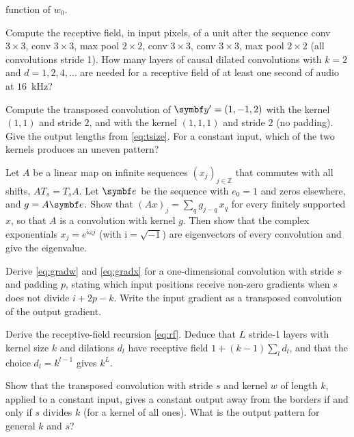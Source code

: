 \documentclass[11pt]{article}
\newcommand{\y}{\vect{y}}
\begin{document}
\begin{questions}
\begin{calculations}
  function of $w_0$.
\item Compute the receptive field, in input pixels, of a unit after the sequence conv $3 \times 3$, conv $3 \times 3$, max pool
  $2 \times 2$, conv $3 \times 3$, conv $3 \times 3$, max pool $2 \times 2$ (all convolutions stride 1). How many layers of
  causal dilated convolutions with $k = 2$ and $d = 1, 2, 4, \dots$ are needed for a receptive field of at least one second
  of audio at $16$~kHz?
\item Compute the transposed convolution of $\y' = (1, -1, 2)$ with the kernel $(1, 1)$ and stride $2$, and with the kernel
  $(1, 1, 1)$ and stride $2$ (no padding). Give the output lengths from \eqref{eq:tsize}. For a constant input, which of the
  two kernels produces an uneven pattern?
\end{calculations}

\begin{derivations}
\item Let $A$ be a linear map on infinite sequences $(x_j)_{j \in \mathbb{Z}}$ that commutes with all shifts,
  $A T_s = T_s A$. Let $\vect{e}$ be the sequence with $e_0 = 1$ and zeros elsewhere, and $g = A\vect{e}$. Show that
  $(A x)_j = \sum_q g_{j-q}\, x_q$ for every finitely supported $x$, so that $A$ is a convolution with kernel $g$. Then show
  that the complex exponentials $x_j = e^{\mathrm{i}\omega j}$ (with $\mathrm{i} = \sqrt{-1}$) are eigenvectors of every
  convolution and give the eigenvalue.
\item Derive \eqref{eq:gradw} and \eqref{eq:gradx} for a one-dimensional convolution with stride $s$ and padding $p$,
  stating which input positions receive non-zero gradients when $s$ does not divide $i + 2p - k$. Write the input gradient
  as a transposed convolution of the output gradient.
\item Derive the receptive-field recursion \eqref{eq:rf}. Deduce that $L$ stride-1 layers with kernel size $k$ and
  dilations $d_l$ have receptive field $1 + (k - 1)\sum_l d_l$, and that the choice $d_l = k^{l-1}$ gives $k^L$.
\item Show that the transposed convolution with stride $s$ and kernel $w$ of length $k$, applied to a constant input,
  gives a constant output away from the borders if and only if $s$ divides $k$ (for a kernel of all ones). What is the
  output pattern for general $k$ and $s$?
\end{derivations}


\end{questions}
\end{document}
